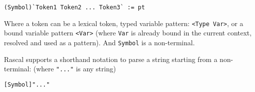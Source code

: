 \begin{lstlisting}[language=rascal]
(Symbol)`Token1 Token2 ... Token3` := pt
\end{lstlisting}

Where a token can be a lexical token, typed variable pattern: \lstinline$<Type Var>$, or a bound variable pattern \lstinline$<Var>$ (where \lstinline$Var$ is already bound in the current context, resolved and used as a pattern). And \lstinline$Symbol$ is a non-terminal.

Rascal supports a shorthand notation to parse a string starting from a non-terminal: (where \lstinline$"..."$ is any string)

\begin{lstlisting}[language=rascal]
[Symbol]"..."
\end{lstlisting}
